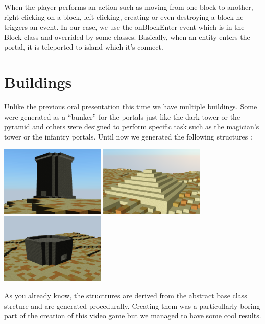 \documentclass[article]{report}             %
\begin{document}
				When the player performs an action such as moving from one block to another, right clicking on a block, left clicking, creating or even destroying a block he triggers an event. In our case, we use the onBlockEnter event which is in the Block class and overrided by some classes. Basically, when an entity enters the portal, it is teleported to island which it's connect.
			\section{Buildings}  
				Unlike the previous oral presentation this time we have multiple buildings. Some were generated as a ``bunker'' for the portals just like the dark tower or the pyramid and others were designed to perform specific task such as the magician's tower or the infantry portals. Until now we generated the following structures :

				\begin{center}
					\includegraphics[width=5cm]{images/structure.png}
					\includegraphics[width=5cm]{images/structure2.png}
					\includegraphics[width=5cm]{images/structure3.png}
				\end{center}
				
				As you already know, the structrures are derived from the abstract base class strcture and are generated procedurally. Creating them was a particullarly boring part of the creation of this video game but we managed to have some cool results.\\
\end{document}
